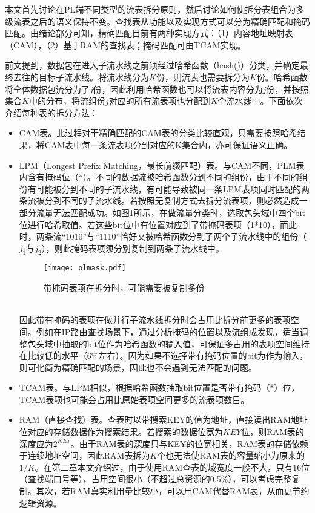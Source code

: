 本文首先讨论在PL端不同类型的流表拆分原则，然后讨论如何使拆分表组合为多级流表之后的语义保持不变。查找表从功能以及实现方式可以分为精确匹配和掩码匹配。由绪论部分可知，精确匹配目前有两种实现方式：（1）内容地址映射表（CAM），（2）基于RAM的查找表；掩码匹配可由TCAM实现。

前文提到，数据包在进入子流水线之前须经过哈希函数（hash()）分类，并确定最终去往的目标子流水线。将流水线分为$K$份，则流表也需要拆分为$K$份。哈希函数将全体数据包流分为了$j$份，因此利用哈希函数也可以将流表内容分为$j$份，并按照集合$K$中的分布，将流组份$j$对应的所有流表项也分配到$K$个流水线中。下面依次介绍每种表的拆分方法：

\begin{itemize}
	\item CAM表。此过程对于精确匹配的CAM表的分类比较直观，只需要按照哈希结果，将CAM表中每一条流表项分到对应的K集合内，亦可保证语义正确。
	
	\item LPM（Longest Prefix Matching，最长前缀匹配）表。与CAM不同，PLM表内含有掩码位（*）。不同的数据流被哈希函数分到不同的组份，由于不同的组份有可能被分到不同的子流水线，有可能导致被同一条LPM表项同时匹配的两条流被分到不同的子流水线。若按照无复制方式去拆分流表项，则必然造成一部分流量无法匹配成功。如图\ref{fig:plmask}所示，在做流量分类时，选取包头域中四个bit位进行哈希取值。若这些bit位中有位置对应到了带掩码表项（1*10），而此时，两条流“1010”与“1110”恰好又被哈希函数分到了两个子流水线中的组份（$j_1$与$j_2$），则此掩码表项须分别复制到两条子流水线中。
	\begin{figure}[!ht]
		\centering 
	\vspace{-1.5mm} 
		\texttt{[image: plmask.pdf]}
		\caption{带掩码表项在拆分时，可能需要被复制多份} \label{fig:plmask}
	\end{figure}
	\\因此带有掩码的表项在做并行子流水线拆分时会占用比拆分前更多的表项空间。例如在IP路由查找场景下，通过分析掩码的位置以及流组成发现，适当调整包头域中抽取的bit位作为哈希函数的输入值，可保证多占用的表项空间维持在比较低的水平（6\%左右）。因为如果不选择带有掩码位置的bit为作为输入，则可化简为精确匹配的场景，因此也不会遇到无法匹配的问题。
	\item TCAM表。与LPM相似，根据哈希函数抽取bit位置是否带有掩码（*）位，TCAM表项也可能会占用比原始表项空间更多的流表项数目。
	\item RAM（直接查找）表。查表时以带搜索KEY的值为地址，直接读出RAM地址位对应的存储数据作为搜索结果。若搜索的数据位宽为$ KEY $位，则RAM表的深度应为$2^{KEY}$。由于RAM表的深度只与KEY的位宽相关，RAM表的存储依赖于连续地址空间，因此RAM表拆为$ K $个也无法使RAM表的容量缩小为原来的$1/K$。在第二章本文介绍过，由于使用RAM查表的域宽度一般不大，只有16位（查找端口号等），占用空间很小（不超过总资源的0.5\%），可以考虑完整复制。其次，若RAM真实利用量比较小，可以用CAM代替RAM表，从而更节约逻辑资源。
\end{itemize}

